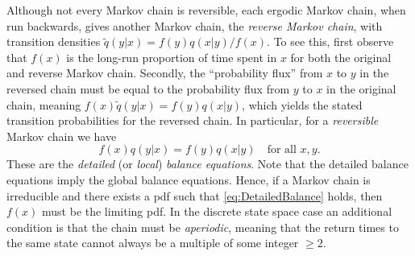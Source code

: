 Although not every Markov chain is reversible, each ergodic Markov chain, when run backwards, gives another Markov chain, the \textit{reverse Markov chain}, with transition densities $\tilde{q}(y|x) = f(y)q(x|y)/f(x)$. To see this, first observe that $f(x)$ is the long-run proportion of time spent in $x$ for both the original and reverse Markov chain. Secondly, the ``probability flux'' from $x$ to $y$ in the reversed chain must be equal to the probability flux from $y$ to $x$ in the original chain, meaning $f(x)\tilde{q}(y|x) = f(y)q(x|y)$, which yields the stated transition probabilities for the reversed chain. In particular, for a \textit{reversible} Markov chain we have
\begin{equation} \label{eq:DetailedBalance}
	f(x)q(y|x) = f(y)q(x|y) \quad \text{for all } x, y.
\end{equation}
These are the \textit{detailed} (or \textit{local}) \textit{balance equations}. Note that the detailed balance equations imply the global balance equations. Hence, if a Markov chain is irreducible and there exists a pdf such that \cref{eq:DetailedBalance} holds, then $f(x)$ must be the limiting pdf. In the discrete state space case an additional condition is that the chain must be \textit{aperiodic}, meaning that the return times to the same state cannot always be a multiple of some integer $\ge 2$.
